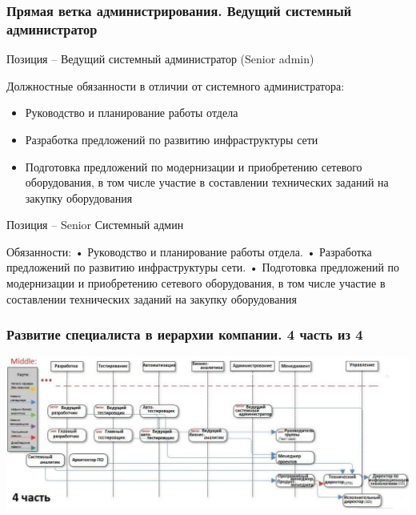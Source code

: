 \documentclass{../industrial-development}
\begin{document}
\begin{frame} \frametitle{Прямая ветка администрирования. Ведущий системный администратор }
 \begin{block}{}
  \alert{Позиция – Ведущий системный администратор (Senior admin)}

Должностные обязанности в отличии от  системного администратора: 
  \end{block}
  \begin{itemize}
  \item   Руководство и планирование работы отдела
  \item  Разработка предложений по развитию инфраструктуры сети
  \item Подготовка предложений по модернизации и приобретению сетевого оборудования, в том числе участие в составлении технических заданий на закупку оборудования
  \end{itemize}
\end{frame}

\lecturenotes
Позиция – Senior Системный админ

Обязанности:
•	Руководство и планирование работы отдела.
•	Разработка предложений по развитию инфраструктуры сети.
•	Подготовка предложений по модернизации и приобретению сетевого оборудования, в том числе участие в составлении технических заданий на закупку оборудования



\begin{frame} \frametitle{Развитие  специалиста в иерархии компании. 4 часть из 4 }
  \centerline{\includegraphics[height=0.53\textheight]{11-IT-specialist's-way/sch22.pdf}}
\end{frame}
\end{document}
